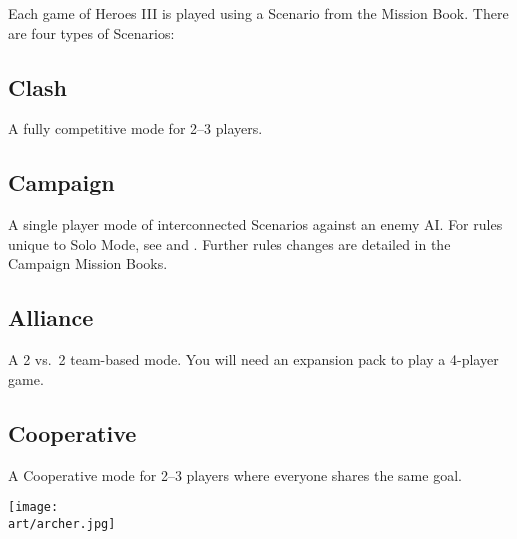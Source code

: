 
\begin{multicols*}{2}

Each game of Heroes III is played using a Scenario from the Mission Book.
There are four types of Scenarios:

\subsection*{Clash}
A fully competitive mode for 2--3 players.

\subsection*{Campaign}
A single player mode of interconnected Scenarios against an enemy AI.
For rules unique to Solo Mode, see  and .
Further rules changes are detailed in the Campaign Mission Books.

\subsection*{Alliance}
A 2 vs.~2 team-based mode.
You will need an expansion pack to play a 4-player game.

\subsection*{Cooperative}
A Cooperative mode for 2--3 players where everyone shares the same goal.

\vspace*{\fill}

\columnbreak

\texttt{[image: \\art/archer.jpg]}

\end{multicols*}
